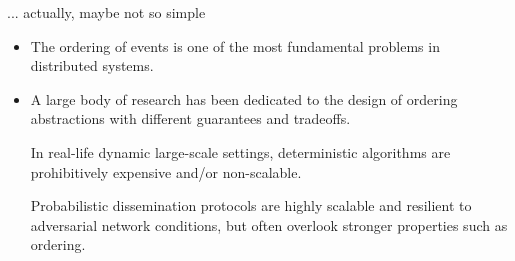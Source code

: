 \begin{frame}{... actually, maybe not so simple}
  
  \begin{itemize}

  \item The ordering of events is one of the most fundamental problems in distributed systems.

  \item A large body of research has been dedicated to the design of ordering abstractions with different guarantees and tradeoffs.

\vspace{5mm}

  \begin{snugshade}
            \begin{center}
  In real-life dynamic large-scale settings, deterministic algorithms are prohibitively expensive and/or non-scalable.
   \end{center}
  \end{snugshade}  

 \begin{snugshade}
            \begin{center}
Probabilistic dissemination protocols are highly scalable and resilient to adversarial network conditions, but often overlook stronger properties such as ordering.
   \end{center}
  \end{snugshade}

  
\end{itemize}

\end{frame}


